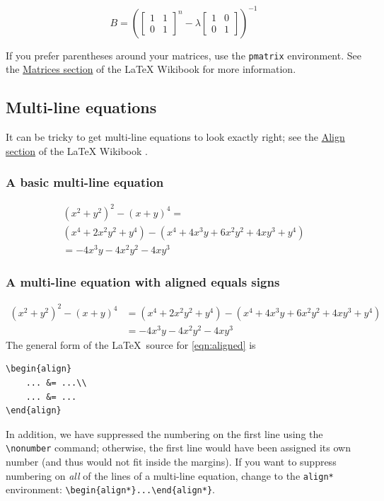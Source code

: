 \documentclass[11pt]{amsart}
\theoremstyle{theorem} %
\theoremstyle{definition}                  %
\theoremstyle{example}                       %
\theoremstyle{remark}                       %
\numberwithin{equation}{section}
\begin{document}
\begin{equation}
B= \left( \begin{bmatrix}1&1\\0&1\end{bmatrix}^n- \lambda \begin{bmatrix}1 &0\\0&1\end{bmatrix}  \right)^{-1}
\end{equation}

If you prefer parentheses around your matrices, use the \verb,pmatrix,
environment. See the \href{https://en.wikibooks.org/wiki/LaTeX/Mathematics#Matrices_and_arrays}{Matrices section} of  the LaTeX Wikibook \cite{wikibook} for more information.

\subsection{Multi-line equations}
It can be tricky to get multi-line equations to look exactly
right; see the \href{https://en.wikibooks.org/wiki/LaTeX/Advanced_Mathematics#align_and_align*}{Align section} of the LaTeX Wikibook \cite{wikibook}.


\subsubsection{A  basic multi-line equation}
 \begin{multline}
 (x^2+y^2)^2 - (x+y)^4 = \\
(x^4+2x^2y^2+y^4)-(x^4+4x^3y+6x^2y^2+4xy^3+y^4) \\
  = -4x^3y - 4 x^2y^2 - 4xy^3 
 \end{multline}
\subsubsection{A multi-line equation with aligned equals signs}
 \begin{align}
 (x^2+y^2)^2 - (x+y)^4 &=  (x^4+2x^2y^2+y^4)-(x^4+4x^3y+6x^2y^2+4xy^3+y^4) \nonumber\\ 
  &= -4x^3y - 4 x^2y^2 - 4xy^3 \label{eqn:aligned}
 \end{align}
The general form of the \LaTeX\ source for \eqref{eqn:aligned} is 
\begin{center}
\begin{minipage}{1in}
\begin{verbatim}
\begin{align}
	... &= ...\\
	... &= ...
\end{align}
\end{verbatim}
\end{minipage}
\end{center}
In addition, we have suppressed the numbering on the first line using the \verb+\nonumber+ command; otherwise, the first line would have been assigned its own number (and thus would not fit inside the margins). 
If you want to suppress numbering on \emph{all} of the lines of a multi-line equation, change to the \texttt{align*} environment: \verb+\begin{align*}...\end{align*}+.
\end{document}
